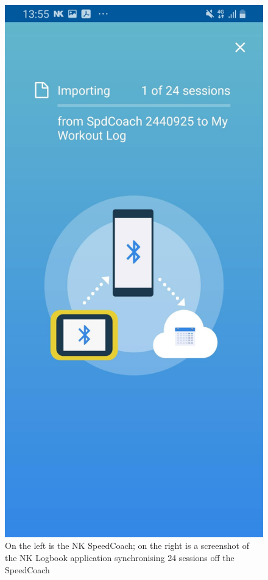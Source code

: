 \documentclass[11pt,twoside,a4paper]{report}
\begin{document}
\begin{figure}[h!]
  \includegraphics[height=0.4\textheight]{nklogbook.jpg}
  \caption{On the left is the NK SpeedCoach; on the right is a screenshot of the NK Logbook application synchronising 24 sessions off the SpeedCoach}
  \label{fig:nklogbook}
\end{figure}
\end{document}

